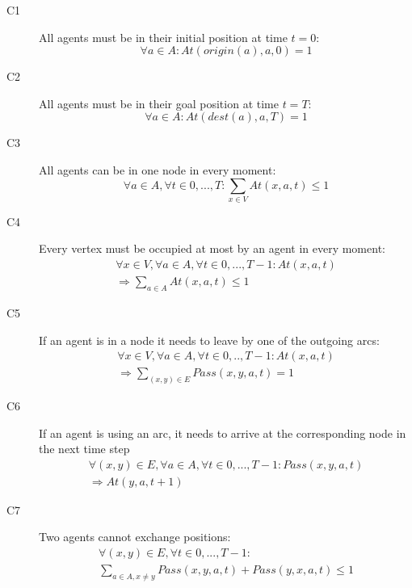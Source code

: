 \documentclass[12pt, a4paper, hidelinks]{article}
\begin{document}
\begin{description}
\item [C1] All agents must be in their initial position at time $t = 0$: 
\begin{equation}
\forall a \in A: At(origin(a), a, 0) = 1
\end{equation}
\item [C2] All agents must be in their goal position at time $t = T$: 
\begin{equation}
\forall a \in A : At(dest(a), a, T) = 1
\end{equation}
\item [C3] All agents can be in one node in every moment: 
\begin{equation}
\forall a \in A, \forall t \in {0,...,T}: \displaystyle\sum_{x \in V}At(x,a,t)\leq1
\end{equation}
\item [C4] Every vertex must be occupied at most by an agent in every moment:
\begin{equation}\begin{split}
\forall x \in V, \forall a \in A, \forall t \in {0,...,T-1}: At(x, a, t) \\ 
\Rightarrow \displaystyle\sum_{a \in A}At(x,a,t)\leq1
\end{split}\end{equation}
\item [C5] If an agent is in a node it needs to leave by one of the outgoing arcs:
\begin{equation}\begin{split}
\forall x \in V, \forall a \in A, \forall t \in {0,..,T-1}: At(x,a,t) \\
\Rightarrow  \displaystyle\sum_{(x,y) \in E}Pass(x,y,a,t)=1
\end{split}\end{equation}
\item [C6] If an agent is using an arc, it needs to arrive at the corresponding node in the next time step
\begin{equation}\begin{split}
\forall (x,y) \in E, \forall a \in A, \forall t \in {0,...,T-1}: Pass(x,y,a,t) \\
\Rightarrow At(y,a,t+1)
\end{split}\end{equation}
\item [C7] Two agents cannot exchange positions:
\begin{equation}\begin{split}
\forall (x,y) \in E, \forall t \in {0,...,T-1}: \\
\displaystyle\sum_{a \in A, x \neq y}Pass(x,y,a,t) + Pass(y,x,a,t) \leq 1
\end{split}\end{equation}
\end{description}
\end{document}
